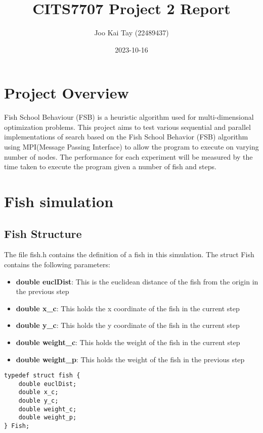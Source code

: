 \documentclass[
]{article}
\title{CITS7707 Project 2 Report}
\author{Joo Kai Tay (22489437)}
\date{2023-10-16}
\providecommand{\tightlist}{%
  \setlength{\itemsep}{0pt}\setlength{\parskip}{0pt}}
\begin{document}
\maketitle

\hypertarget{project-overview}{%
\section{Project Overview}\label{project-overview}}

Fish School Behaviour (FSB) is a heuristic algorithm used for
multi-dimensional optimization problems. This project aims to test
various sequential and parallel implementations of search based on the
Fish School Behavior (FSB) algorithm using MPI(Message Passing
Interface) to allow the program to execute on varying number of nodes.
The performance for each experiment will be measured by the time taken
to execute the program given a number of fish and steps.

\hypertarget{fish-simulation}{%
\section{Fish simulation}\label{fish-simulation}}

\hypertarget{fish-structure}{%
\subsection{Fish Structure}\label{fish-structure}}

The file fish.h contains the definition of a fish in this simulation.
The struct Fish contains the following parameters:

\begin{itemize}
\tightlist
\item
  \textbf{double euclDist}: This is the euclidean distance of the fish
  from the origin in the previous step
\item
  \textbf{double x\_c}: This holds the x coordinate of the fish in the
  current step
\item
  \textbf{double y\_c}: This holds the y coordinate of the fish in the
  current step
\item
  \textbf{double weight\_c}: This holds the weight of the fish in the
  current step
\item
  \textbf{double weight\_p}: This holds the weight of the fish in the
  previous step
\end{itemize}

\begin{verbatim}
typedef struct fish {
    double euclDist;
    double x_c;
    double y_c;
    double weight_c;
    double weight_p;
} Fish;
\end{verbatim}
\end{document}
